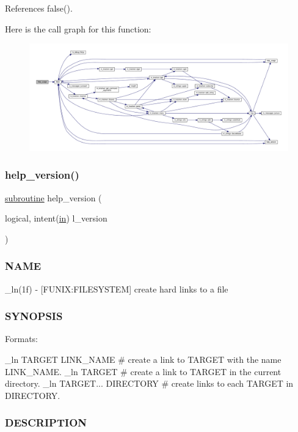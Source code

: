 References false().

Here is the call graph for this function\+:
\nopagebreak
\begin{figure}[H]
\begin{center}
\leavevmode
\includegraphics[width=350pt]{__ln_8f90_a3e09a3b52ee8fb04eeb93fe5761626a8_cgraph}
\end{center}
\end{figure}
\mbox{\label{__ln_8f90_a39c21619b08a3c22f19e2306efd7f766}} 
\subsubsection{\texorpdfstring{help\+\_\+version()}{help\_version()}}
{\footnotesize\ttfamily \hyperlink{M__stopwatch_83_8txt_acfbcff50169d691ff02d4a123ed70482}{subroutine} help\+\_\+version (\begin{DoxyParamCaption}\item[{logical, intent(\hyperlink{M__journal_83_8txt_afce72651d1eed785a2132bee863b2f38}{in})}]{l\+\_\+version }\end{DoxyParamCaption})}



\subsubsection*{N\+A\+ME}

\+\_\+ln(1f) -\/ \mbox{[}F\+U\+N\+IX\+:F\+I\+L\+E\+S\+Y\+S\+T\+EM\mbox{]} create hard links to a file \subsubsection*{S\+Y\+N\+O\+P\+S\+IS}

Formats\+:

\+\_\+ln T\+A\+R\+G\+ET L\+I\+N\+K\+\_\+\+N\+A\+ME \# create a link to T\+A\+R\+G\+ET with the name L\+I\+N\+K\+\_\+\+N\+A\+ME. \+\_\+ln T\+A\+R\+G\+ET \# create a link to T\+A\+R\+G\+ET in the current directory. \+\_\+ln T\+A\+R\+G\+ET... D\+I\+R\+E\+C\+T\+O\+RY \# create links to each T\+A\+R\+G\+ET in D\+I\+R\+E\+C\+T\+O\+RY. \subsubsection*{D\+E\+S\+C\+R\+I\+P\+T\+I\+ON}

